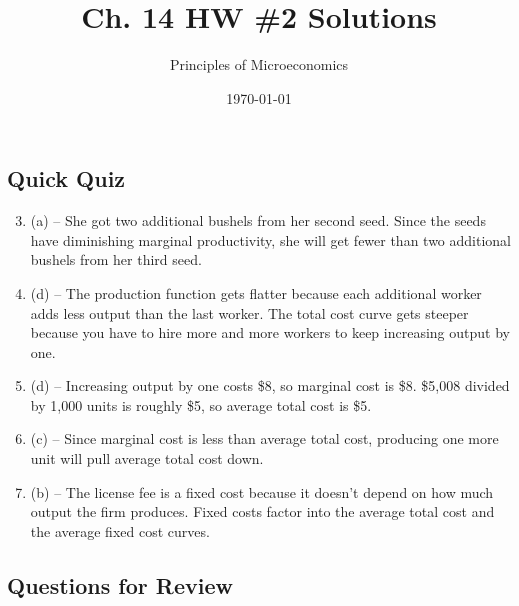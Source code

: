 \documentclass{article}
\title{Ch. 14 HW \#2 Solutions}
\author{Principles of Microeconomics}
\date{\today}
\begin{document}
\maketitle

\subsection*{Quick Quiz}

\begin{enumerate}
\setcounter{enumi}{2}

\item (a) -- She got two additional bushels from her second seed. Since the seeds have diminishing marginal productivity, she will get fewer than two additional bushels from her third seed. 

\item (d) -- The production function gets flatter because each additional worker adds less output than the last worker. The total cost curve gets steeper because you have to hire more and more workers to keep increasing output by one.

\item (d) -- Increasing output by one costs \$8, so marginal cost is \$8. \$5,008 divided by 1,000 units is roughly \$5, so average total cost is \$5.

\item (c) -- Since marginal cost is less than average total cost, producing one more unit will pull average total cost down.

\item (b) -- The license fee is a fixed cost because it doesn't depend on how much output the firm produces. Fixed costs factor into the average total cost and the average fixed cost curves. 

\end{enumerate}

\subsection*{Questions for Review}
\end{document}
